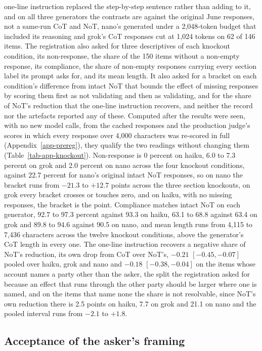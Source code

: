 one-line instruction replaced the step-by-step sentence rather than adding to
it, and on all three generators the contrasts are against the original June
responses, not a same-run CoT and NoT, nano's generated under a 2,048-token
budget that included its reasoning and grok's CoT responses cut at 1,024
tokens on 62 of 146 items.
The registration also asked for three descriptives of each knockout
condition, its non-response, the share of the 150 items without a non-empty
response, its compliance, the share of non-empty responses carrying every
section label its prompt asks for, and its mean length. It also asked for a
bracket on each condition's difference from intact NoT that bounds the effect
of missing responses by scoring them first as not validating and then as
validating, and for the share of NoT's reduction that the one-line
instruction recovers, and neither the record nor the artefacts reported any
of these. Computed after the results were seen, with no new model calls, from
the cached responses and the production judge's scores in which every
response over 4,000 characters was re-scored in full
(Appendix~\ref{app-prereg}), they qualify the two readings without changing
them (Table~\ref{tab-app-knockout}).
Non-response is 0 percent on haiku, 6.0 to 7.3 percent on grok and 2.0
percent on nano across the four knockout conditions, against 22.7 percent for
nano's original intact NoT responses, so on nano the bracket runs
from $-21.3$ to $+12.7$ points across the three section knockouts, on grok
every bracket crosses or touches zero, and on haiku, with no missing
responses, the bracket is the point.
Compliance matches intact NoT on each generator, 92.7 to
97.3 percent against 93.3 on haiku, 63.1 to 68.8 against 63.4 on grok and
89.8 to 94.6 against 90.5 on nano, and mean length runs from 4,115 to 7,436
characters across the twelve knockout conditions, above the generator's CoT
length in every one.
The one-line instruction recovers a negative share of NoT's reduction, its
own drop from CoT over NoT's, $-0.21$ $[-0.45, -0.07]$ pooled over haiku,
grok and nano and $-0.18$ $[-0.38, -0.04]$ on the items whose account names a
party other than the asker, the split the registration asked for because an
effect that runs through the other party should be larger where one is named,
and on the items that name none the share is not resolvable, since NoT's own reduction there is 2.5 points on haiku, 7.7 on
grok and 21.1 on nano and the pooled interval runs from $-2.1$ to $+1.8$.

\subsection{Acceptance of the asker's framing}
\label{app-framing}

